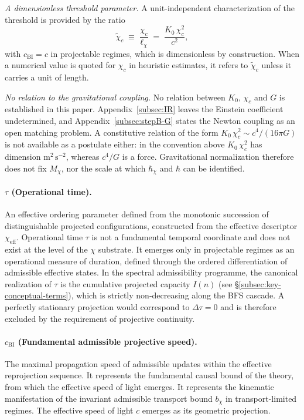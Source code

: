     \medskip
    \noindent\textit{A dimensionless threshold parameter.}
    A unit-independent characterization of the threshold is provided by the ratio
    \begin{equation}
      \tilde{\chi}_c \;\equiv\; \frac{\chi_c}{\ell_\chi}
      \;=\; \frac{K_0\,\chi_c^2}{c^2},
      \label{eq:chitilde}
    \end{equation}
    with $c_{\mathrm{BI}} = c$ in projectable regimes, which is dimensionless by construction.
    When a numerical value is quoted for $\chi_c$ in heuristic estimates, it refers to
    $\tilde{\chi}_c$ unless it carries a unit of length.

    \medskip
    \noindent\textit{No relation to the gravitational coupling.}
    No relation between $K_0$, $\chi_c$ and $G$ is established in this paper.
    Appendix~\ref{subsec:IR} leaves the Einstein coefficient undetermined, and Appendix~\ref{subsec:stepB-G} states the
    Newton coupling as an open matching problem.
    A constitutive relation of the form $K_0\,\chi_c^2 \sim c^4/(16\pi G)$ is not available as a postulate either: in
    the convention above $K_0\,\chi_c^2$ has dimension $\mathrm{m}^{2}\,\mathrm{s}^{-2}$, whereas $c^4/G$ is a force.
    Gravitational normalization therefore does not fix $M_\chi$, nor the scale at which $\hbar_\chi$ and $\hbar$ can
    be identified.

  \paragraph{\texorpdfstring{$\tau$}{τ} (Operational time).}
    An effective ordering parameter defined from the monotonic succession of
    distinguishable projected configurations, constructed from the effective
    descriptor $\chi_{\mathrm{eff}}$.
    Operational time $\tau$ is not a fundamental temporal coordinate and does
    not exist at the level of the $\chi$ substrate.
    It emerges only in projectable regimes as an operational measure of duration,
    defined through the ordered differentiation of admissible effective states.
    In the spectral admissibility programme, the canonical realization of $\tau$
    is the cumulative projected capacity $I(n)$ (see \S\ref{subsec:key-conceptual-terms}),
    which is strictly non-decreasing along the BFS cascade.
    A perfectly stationary projection would correspond to $\Delta\tau=0$ and
    is therefore excluded by the requirement of projective continuity.

  \paragraph{\texorpdfstring{$c_{\mathrm{BI}}$}{cχ} (Fundamental admissible projective speed).}
    The maximal propagation speed of admissible updates within the effective
    reprojection sequence.
    It represents the fundamental causal bound of the theory, from which the
    effective speed of light emerges.
    It represents the kinematic manifestation of the invariant admissible transport
    bound $b_{\chi}$ in transport-limited regimes.
    The effective speed of light $c$ emerges as its geometric projection.
